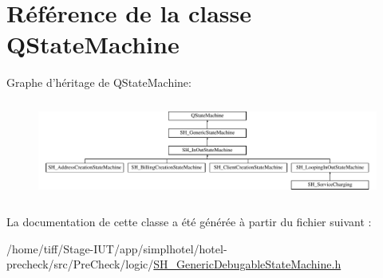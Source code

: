 \hypertarget{classQStateMachine}{\section{Référence de la classe Q\-State\-Machine}
\label{classQStateMachine}
}
Graphe d'héritage de Q\-State\-Machine\-:\begin{figure}[H]
\begin{center}
\leavevmode
\includegraphics[height=3.240741cm]{classQStateMachine}
\end{center}
\end{figure}


La documentation de cette classe a été générée à partir du fichier suivant \-:\begin{DoxyCompactItemize}
\item 
/home/tiff/\-Stage-\/\-I\-U\-T/app/simplhotel/hotel-\/precheck/src/\-Pre\-Check/logic/\hyperlink{SH__GenericDebugableStateMachine_8h}{S\-H\-\_\-\-Generic\-Debugable\-State\-Machine.\-h}\end{DoxyCompactItemize}
